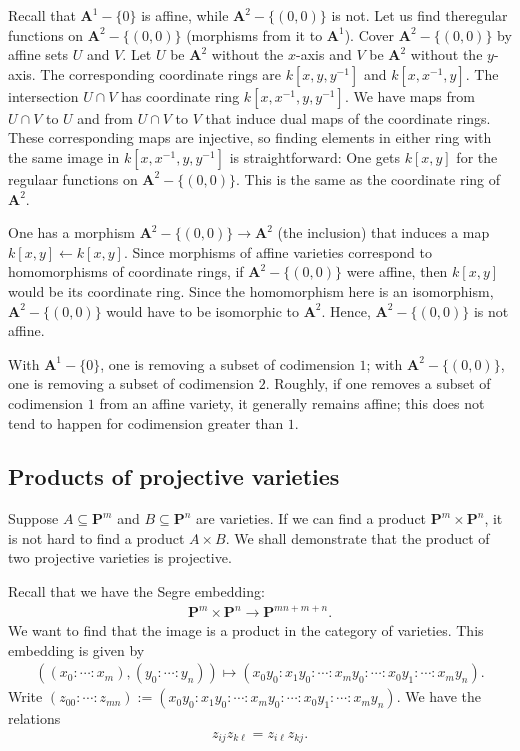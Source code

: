 \documentclass [11 pt, oneside, margin = 1 in] {article}
\begin{document}
\begin{example}[ ]\label{}\text{}
Recall that $\mathbf{A}^1-\{0\}$ is affine, while $\mathbf{A}^2 - \{(0,0)\}$ is not. Let us find theregular functions on $\mathbf{A}^2 - \{(0,0)\}$ (morphisms from it to $\mathbf{A}^1$). Cover $\mathbf{A}^2-\{(0,0)\}$ by affine sets $U$ and $V$. Let $U$ be $\mathbf{A}^2$ without the $x$-axis and $V$ be $\mathbf{A}^2$ without the $y$-axis. The corresponding coordinate rings are $k[x,y,y^{-1}]$ and $k[x,x^{-1},y]$. The intersection $U\cap V$ has coordinate ring $k[x,x^{-1},y,y^{-1}]$. We have maps from $U\cap V$ to $U$ and from $U\cap V$ to $V$ that induce dual maps of the coordinate rings. These corresponding maps are injective, so finding elements in either ring with the same image in $k[x,x^{-1},y,y^{-1}]$ is straightforward: One gets $k[x,y]$ for the regulaar functions on $\mathbf{A}^2-\{(0,0)\}$. This is the same as the coordinate ring of $\mathbf{A}^2$.

One has a morphism $\mathbf{A}^2-\{(0,0)\}\longrightarrow \mathbf{A}^2$ (the inclusion) that induces a map $k[x,y] \longleftarrow k[x,y]$. Since morphisms of affine varieties correspond to homomorphisms of coordinate rings, if $\mathbf{A}^2-\{(0,0)\}$ were affine, then $k[x,y]$ would be its coordinate ring. Since the homomorphism here is an isomorphism, $\mathbf{A}^2-\{(0,0)\}$ would have to be isomorphic to $\mathbf{A}^2$. Hence, $\mathbf{A}^2-\{(0,0)\}$ is not affine.
\end{example}

\begin{remark}
	With $\mathbf{A}^1-\{0\}$, one is removing a subset of codimension $1$; with $\mathbf{A}^2-\{(0,0)\}$, one is removing a subset of codimension $2$. Roughly, if one removes a subset of codimension $1$ from an affine variety, it generally remains affine; this does not tend to happen for codimension greater than $1$.
\end{remark}


\subsection{Products of projective varieties}
Suppose $A\subseteq \mathbf{P}^m$ and $B\subseteq \mathbf{P}^n$ are varieties. If we can find a product $\mathbf{P}^m\times \mathbf{P}^n$, it is not hard to find a product $A\times B$. We shall demonstrate that the product of two projective varieties is projective.

Recall that we have the Segre embedding:
\begin{align*}
	\mathbf{P}^m\times \mathbf{P}^n\longrightarrow \mathbf{P}^{mn+m+n}.
\end{align*}
We want to find that the image is a product in the category of varieties. This embedding is given by
\begin{align*}
	((x_0:\cdots:x_m), (y_0:\cdots:y_n))\longmapsto (x_0y_0:x_1y_0:\cdots:x_my_0:\cdots: x_0y_1:\cdots:x_my_n).
\end{align*}
Write $(z_{00}:\cdots:z_{mn}):=(x_0y_0:x_1y_0:\cdots:x_my_0:\cdots: x_0y_1:\cdots:x_my_n)$. We have the relations
\begin{align*}
	z_{ij}z_{k\ell} = z_{i\ell}z_{kj}.
\end{align*}
\end{document}
